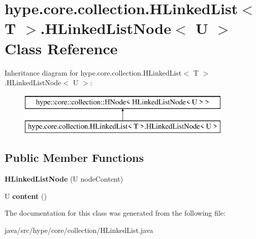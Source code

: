 \hypertarget{classhype_1_1core_1_1collection_1_1_h_linked_list_3_01_t_01_4_1_1_h_linked_list_node_3_01_u_01_4}{\section{hype.\-core.\-collection.\-H\-Linked\-List$<$ T $>$.H\-Linked\-List\-Node$<$ U $>$ Class Reference}
\label{classhype_1_1core_1_1collection_1_1_h_linked_list_3_01_t_01_4_1_1_h_linked_list_node_3_01_u_01_4}
}
Inheritance diagram for hype.\-core.\-collection.\-H\-Linked\-List$<$ T $>$.H\-Linked\-List\-Node$<$ U $>$\-:\begin{figure}[H]
\begin{center}
\leavevmode
\includegraphics[height=2.000000cm]{classhype_1_1core_1_1collection_1_1_h_linked_list_3_01_t_01_4_1_1_h_linked_list_node_3_01_u_01_4}
\end{center}
\end{figure}
\subsection*{Public Member Functions}
\begin{DoxyCompactItemize}
\item 
\hypertarget{classhype_1_1core_1_1collection_1_1_h_linked_list_3_01_t_01_4_1_1_h_linked_list_node_3_01_u_01_4_a47bcbbc46cfbd43d00a5d253d0a36841}{{\bfseries H\-Linked\-List\-Node} (U node\-Content)}\label{classhype_1_1core_1_1collection_1_1_h_linked_list_3_01_t_01_4_1_1_h_linked_list_node_3_01_u_01_4_a47bcbbc46cfbd43d00a5d253d0a36841}

\item 
\hypertarget{classhype_1_1core_1_1collection_1_1_h_linked_list_3_01_t_01_4_1_1_h_linked_list_node_3_01_u_01_4_a4246e6fe10b19aec1b42ff1245c0a0e4}{U {\bfseries content} ()}\label{classhype_1_1core_1_1collection_1_1_h_linked_list_3_01_t_01_4_1_1_h_linked_list_node_3_01_u_01_4_a4246e6fe10b19aec1b42ff1245c0a0e4}

\end{DoxyCompactItemize}


The documentation for this class was generated from the following file\-:\begin{DoxyCompactItemize}
\item 
java/src/hype/core/collection/H\-Linked\-List.\-java\end{DoxyCompactItemize}

